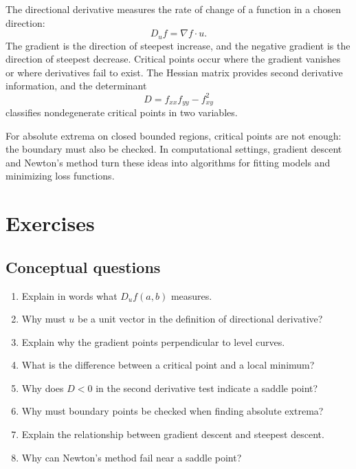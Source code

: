 \documentclass[11pt]{article}
\newcommand{\grad}{\nabla}
\begin{document}
The directional derivative measures the rate of change of a function in a chosen direction:
\[
D_u f=\grad f\cdot u.
\]
The gradient is the direction of steepest increase, and the negative gradient is the direction of steepest decrease. Critical points occur where the gradient vanishes or where derivatives fail to exist. The Hessian matrix provides second derivative information, and the determinant
\[
D=f_{xx}f_{yy}-f_{xy}^2
\]
classifies nondegenerate critical points in two variables.

For absolute extrema on closed bounded regions, critical points are not enough: the boundary must also be checked. In computational settings, gradient descent and Newton's method turn these ideas into algorithms for fitting models and minimizing loss functions.

\section{Exercises}

\subsection*{Conceptual questions}
\begin{enumerate}
  \item Explain in words what $D_u f(a,b)$ measures.
  \item Why must $u$ be a unit vector in the definition of directional derivative?
  \item Explain why the gradient points perpendicular to level curves.
  \item What is the difference between a critical point and a local minimum?
  \item Why does $D<0$ in the second derivative test indicate a saddle point?
  \item Why must boundary points be checked when finding absolute extrema?
  \item Explain the relationship between gradient descent and steepest descent.
  \item Why can Newton's method fail near a saddle point?
\end{enumerate}
\end{document}
